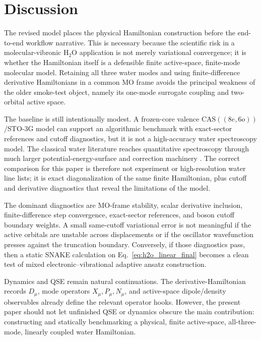 \documentclass[
  reprint,
  amsmath,
  amssymb,
  aps,
  pra,
  nofootinbib,
  superscriptaddress,
  floatfix
]{revtex4-2}
\newcommand{\CAS}{\mathrm{CAS}}
\newcommand{\HtwoO}{\mathrm{H_2O}}
\begin{document}
\section{Discussion}
\label{sec:discussion}

The revised model places the physical Hamiltonian construction before the end-to-end workflow narrative.  This is necessary because the scientific risk in a molecular-vibronic \(\HtwoO\) application is not merely variational convergence; it is whether the Hamiltonian itself is a defensible finite active-space, finite-mode molecular model.  Retaining all three water modes and using finite-difference derivative Hamiltonians in a common MO frame avoids the principal weakness of the older smoke-test object, namely its one-mode surrogate coupling and two-orbital active space.

The baseline is still intentionally modest.  A frozen-core valence \(\CAS((8e,6o))\)/STO-3G model can support an algorithmic benchmark with exact-sector references and cutoff diagnostics, but it is not a high-accuracy water spectroscopy model.  The classical water literature reaches quantitative spectroscopy through much larger potential-energy-surface and correction machinery \cite{PartridgeSchwenke1997,Polyansky2013Water}.  The correct comparison for this paper is therefore not experiment or high-resolution water line lists; it is exact diagonalization of the same finite Hamiltonian, plus cutoff and derivative diagnostics that reveal the limitations of the model.

The dominant diagnostics are MO-frame stability, scalar derivative inclusion, finite-difference step convergence, exact-sector references, and boson cutoff boundary weights.  A small same-cutoff variational error is not meaningful if the active orbitals are unstable across displacements or if the oscillator wavefunction presses against the truncation boundary.  Conversely, if those diagnostics pass, then a static SNAKE calculation on Eq.~\eqref{eq:h2o_linear_final} becomes a clean test of mixed electronic--vibrational adaptive ansatz construction.

Dynamics and QSE remain natural continuations.  The derivative-Hamiltonian records \(D_\mu\), mode operators \(X_\mu,P_\mu,N_\mu\), and active-space dipole/density observables already define the relevant operator hooks.  However, the present paper should not let unfinished QSE or dynamics obscure the main contribution: constructing and statically benchmarking a physical, finite active-space, all-three-mode, linearly coupled water Hamiltonian.
\end{document}
